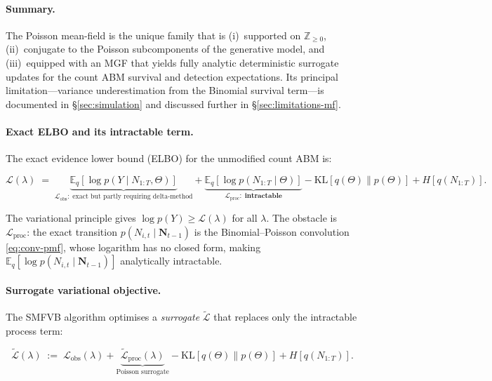 \documentclass[review,12pt]{elsarticle}
\theoremstyle{definition}
\begin{document}
\paragraph{Summary.}
The Poisson mean-field is the unique family that is (i)~supported on
$\mathbb{Z}_{\ge0}$, (ii)~conjugate to the Poisson subcomponents of the
generative model, and (iii)~equipped with an MGF that yields fully analytic
deterministic surrogate updates for the count ABM survival and detection
expectations.  Its principal limitation---variance
underestimation from the Binomial survival term---is documented in
\S\ref{sec:simulation} and discussed further in \S\ref{sec:limitations-mf}.

\paragraph{Exact ELBO and its intractable term.}
The exact evidence lower bound (ELBO) for the unmodified count ABM is:

\begin{equation}\label{eq:elbo}
\mathcal{L}(\lambda)
\;=\;
\underbrace{\mathbb{E}_q[\log p(Y\mid N_{1:T},\Theta)]}_{\mathcal{L}_\mathrm{obs}:\;\text{exact but partly requiring delta-method}}
+\underbrace{\mathbb{E}_q[\log p(N_{1:T}\mid\Theta)]}_{\mathcal{L}_\mathrm{proc}:\;\textbf{intractable}}
-\mathrm{KL}[q(\Theta)\|p(\Theta)]
+H[q(N_{1:T})].
\end{equation}

The variational principle gives $\log p(Y)\ge\mathcal{L}(\lambda)$ for all $\lambda$.
The obstacle is $\mathcal{L}_\mathrm{proc}$: the exact transition
$p(N_{i,t}\mid\mathbf{N}_{t-1})$ is the Binomial--Poisson convolution
\eqref{eq:conv-pmf}, whose logarithm has no closed form, making
$\mathbb{E}_q[\log p(N_{i,t}\mid\mathbf{N}_{t-1})]$ analytically intractable.

\paragraph{Surrogate variational objective.}
The SMFVB algorithm optimises a \emph{surrogate} $\tilde{\mathcal{L}}$ that
replaces only the intractable process term:

\begin{equation}\label{eq:surr-elbo}
\tilde{\mathcal{L}}(\lambda)
\;:=\;
\mathcal{L}_\mathrm{obs}(\lambda)
+\underbrace{\tilde{\mathcal{L}}_\mathrm{proc}(\lambda)}_{\text{Poisson surrogate}}
-\mathrm{KL}[q(\Theta)\|p(\Theta)]
+H[q(N_{1:T})].
\end{equation}
\end{document}
